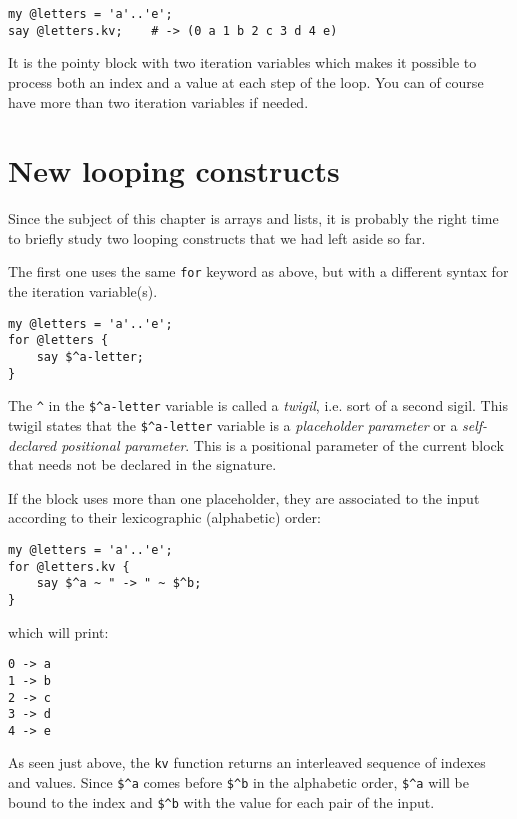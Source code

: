 \begin{verbatim}
my @letters = 'a'..'e';
say @letters.kv;    # -> (0 a 1 b 2 c 3 d 4 e)
\end{verbatim}

It is the pointy block with two iteration variables 
which makes it possible to process both an index and a value at each step of the loop. You can of course have more than two iteration variables if needed.


\section{New looping constructs}

Since the subject of this chapter is arrays and lists, 
it is probably the right time to briefly study two 
looping constructs that we had left aside so far.

The first one uses the same {\tt for} keyword as above, 
but with a different syntax for the iteration variable(s).

\begin{verbatim}
my @letters = 'a'..'e';
for @letters { 
    say $^a-letter; 
}
\end{verbatim}

The \verb'^' in the \verb'$^a-letter' variable is called a \emph{twigil}, i.e. sort of a second sigil. This twigil 
states that the \verb'$^a-letter' variable is a  \emph{placeholder parameter} or a \emph{self-declared 
positional parameter}. This is a positional parameter 
of the current block that needs not be declared in 
the signature.

If the block uses more than one placeholder, they are 
associated to the input according to their lexicographic 
(alphabetic) order:

\begin{verbatim}
my @letters = 'a'..'e';
for @letters.kv { 
    say $^a ~ " -> " ~ $^b; 
}
\end{verbatim}
%
which will print:
\begin{verbatim}
0 -> a
1 -> b
2 -> c
3 -> d
4 -> e
\end{verbatim}
%

As seen just above, the {\tt kv} function returns an 
interleaved sequence of indexes and values. Since \verb'$^a' comes before \verb'$^b' in the alphabetic 
order, \verb'$^a' will be bound to the index and \verb'$^b' with the value for each pair of the input.

